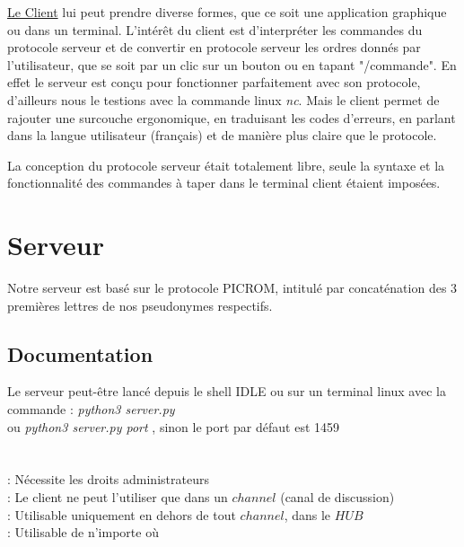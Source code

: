 \documentclass[12pt]{article}
\begin{document}
\underline{Le Client} lui peut prendre diverse formes, que ce soit une application graphique
ou dans un terminal. L'intérêt du client est d'interpréter les commandes du protocole serveur
et de convertir en protocole serveur les ordres donnés par l'utilisateur, que se soit par un
clic sur un bouton ou en tapant "/commande". En effet le serveur est conçu pour fonctionner
parfaitement avec son protocole, d'ailleurs nous le testions avec la commande linux \emph{nc}.
Mais le client permet de rajouter une surcouche ergonomique, en traduisant les codes d'erreurs,
en parlant dans la langue utilisateur (français) et de manière plus claire que le protocole.

La conception du protocole serveur était totalement libre, seule la syntaxe et
la fonctionnalité des commandes
à taper dans le terminal client étaient imposées.


\section{Serveur}
Notre serveur est basé sur le protocole PICROM, intitulé par concaténation des
3 premières lettres de nos pseudonymes respectifs.

\subsection{Documentation}
Le serveur peut-être lancé depuis le shell IDLE ou sur un terminal linux avec
la commande : \emph{python3 server.py}
\\ou \emph{python3 server.py port} , sinon le port par défaut est 1459
\\

\\

\\ : Nécessite les droits administrateurs
\\ : Le client ne peut l'utiliser que dans un $channel$ (canal de discussion)
\\ : Utilisable uniquement en dehors de tout $channel$, dans le $HUB$
\\ : Utilisable de n'importe où
\end{document}
